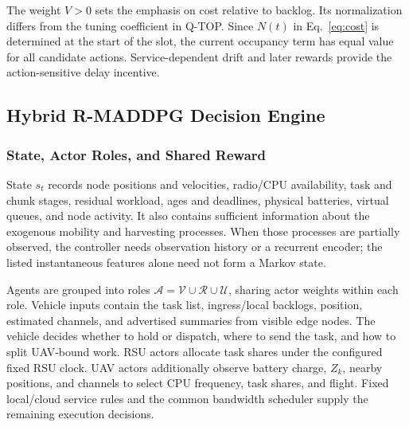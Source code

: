 \documentclass[journal]{IEEEtran}
\begin{document}
The weight $V>0$ sets the emphasis on cost relative to backlog. Its normalization differs from the tuning coefficient in Q-TOP. Since $N(t)$ in Eq.~\eqref{eq:cost} is determined at the start of the slot, the current occupancy term has equal value for all candidate actions. Service-dependent drift and later rewards provide the action-sensitive delay incentive.

\subsection{Hybrid R-MADDPG Decision Engine}
\subsubsection{State, Actor Roles, and Shared Reward}
State $s_t$ records node positions and velocities, radio/CPU availability, task and chunk stages, residual workload, ages and deadlines, physical batteries, virtual queues, and node activity. It also contains sufficient information about the exogenous mobility and harvesting processes. When those processes are partially observed, the controller needs observation history or a recurrent encoder; the listed instantaneous features alone need not form a Markov state.

Agents are grouped into roles $\mathcal A=\mathcal V\cup\mathcal R\cup\mathcal U$, sharing actor weights within each role. Vehicle inputs contain the task list, ingress/local backlogs, position, estimated channels, and advertised summaries from visible edge nodes. The vehicle decides whether to hold or dispatch, where to send the task, and how to split UAV-bound work. RSU actors allocate task shares under the configured fixed RSU clock. UAV actors additionally observe battery charge, $Z_k$, nearby positions, and channels to select CPU frequency, task shares, and flight. Fixed local/cloud service rules and the common bandwidth scheduler supply the remaining execution decisions.
\end{document}

